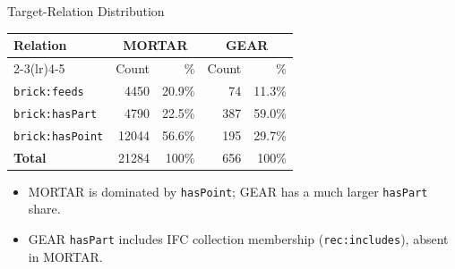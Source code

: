 \documentclass[10pt]{beamer}
\begin{document}
\begin{frame}{Target-Relation Distribution}
  \begin{table}
    \centering
    \begin{tabular}{lrrrr}
      \toprule
      \textbf{Relation} & \multicolumn{2}{c}{\textbf{MORTAR}} & \multicolumn{2}{c}{\textbf{GEAR}} \\
      \cmidrule(lr){2-3}\cmidrule(lr){4-5}
                        & Count & \% & Count & \% \\
      \midrule
\texttt{brick:feeds} & 4450 & 20.9\% & 74 & 11.3\% \\
\texttt{brick:hasPart} & 4790 & 22.5\% & 387 & 59.0\% \\
\texttt{brick:hasPoint} & 12044 & 56.6\% & 195 & 29.7\% \\
      \midrule
\textbf{Total} & 21284 & 100\% & 656 & 100\% \\
      \bottomrule
    \end{tabular}
  \end{table}
  \vspace{0.5em}
  \begin{itemize}
    \small
    \item MORTAR is dominated by \texttt{hasPoint}; GEAR has a much larger \texttt{hasPart} share.
    \item GEAR \texttt{hasPart} includes IFC collection membership (\texttt{rec:includes}),
          absent in MORTAR.
  \end{itemize}
\end{frame}
\end{document}
